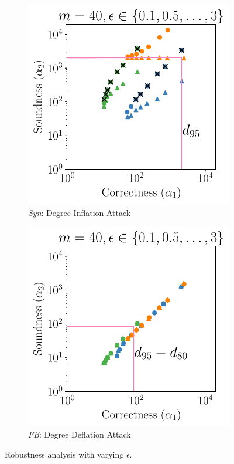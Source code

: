 \begin{figure}
  \begin{subfigure}[b]{0.49\linewidth}
    \centering \includegraphics[width=1\linewidth]{Plots/gnm_inf_vary_40.pdf}    
        \caption{\textit{Syn}: Degree Inflation Attack}
        \label{chap4-fig:Syn:privacy}\end{subfigure}
        \begin{subfigure}[b]{0.49\linewidth}
        \includegraphics[width=\linewidth]{Plots/fb_def_vary_40.pdf}    
        \caption{\textit{FB}: Degree Deflation Attack}
        \label{chap4-fig:FB:privacy}
        \end{subfigure}    
\caption[Robustness analysis with varying $\epsilon$.]{Robustness analysis with varying $\epsilon$.}
\end{figure}
